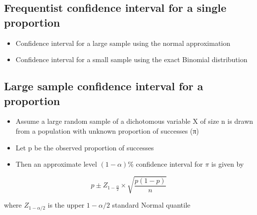 \documentclass[
]{book}
\providecommand{\tightlist}{%
  \setlength{\itemsep}{0pt}\setlength{\parskip}{0pt}}
\begin{document}
\hypertarget{frequentist-confidence-interval-for-a-single-proportion}{%
\subsection{Frequentist confidence interval for a single proportion}\label{frequentist-confidence-interval-for-a-single-proportion}}

\begin{itemize}
\tightlist
\item
  Confidence interval for a large sample using the normal approximation
\item
  Confidence interval for a small sample using the exact Binomial distribution
\end{itemize}

\hypertarget{large-sample-confidence-interval-for-a-proportion}{%
\subsection{Large sample confidence interval for a proportion}\label{large-sample-confidence-interval-for-a-proportion}}

\begin{itemize}
\tightlist
\item
  Assume a large random sample of a dichotomous variable X of size n is drawn from a population with unknown proportion of successes (π)
\item
  Let p be the observed proportion of successes
\item
  Then an approximate level \((1-\alpha)\)\% confidence interval for \(\pi\) is given by
\end{itemize}

\[p\pm Z_{1-\frac{\alpha}{2}}\times\sqrt{\frac{p(1-p)}{n}}\]

where \(Z_{1-\alpha/2}\) is the upper \(1-\alpha/2\) standard Normal quantile
\end{document}
